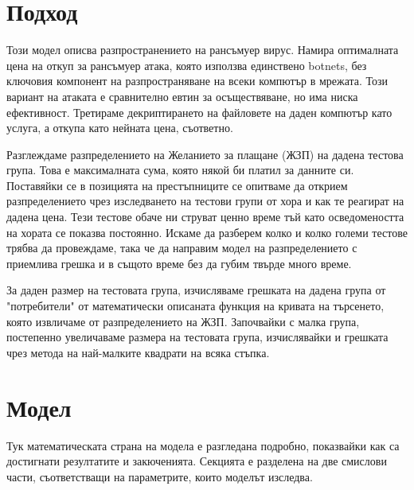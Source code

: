 \documentclass[11pt, a4paper]{article}
\theoremstyle{definition}
\begin{document}
	\section{Подход}
		Този модел описва разпространението на рансъмуер вирус. Намира оптималната цена на откуп за рансъмуер атака, която използва единствено botnets, без ключовия компонент на разпространяване на всеки компютър в мрежата. Този вариант на атаката е сравнително евтин за осъществяване, но има ниска ефективност. Третираме декриптирането на файловете на даден компютър като услуга, а откупа като нейната цена, съответно. \par
		Разглеждаме разпределението на Желанието за плащане (ЖЗП) на дадена тестова група. Това е максималната сума, която някой би платил за данните си. Поставяйки се в позицията на престъпниците се опитваме да открием разпределението чрез изследването на тестови групи от хора и как те реагират на дадена цена. Тези тестове обаче ни струват ценно време тъй като осведомеността на хората се показва постоянно. Искаме да разберем колко и колко големи тестове трябва да провеждаме, така че да направим модел на разпределението с приемлива грешка и в същото време без да губим твърде много време.\par
		За даден размер на тестовата група, изчисляваме грешката на дадена група от "потребители" от математически описаната функция на кривата на търсенето, която извличаме от разпределението на ЖЗП. Започвайки с малка група, постепенно увеличаваме размера на тестовата група, изчислявайки и грешката чрез метода на най-малките квадрати на всяка стъпка.
	\section{Модел}
		Тук математическата страна на модела е разгледана подробно, показвайки как са достигнати резултатите и закюченията. Секцията е разделена на две смислови части, съответстващи на параметрите, които моделът изследва.
\end{document}
